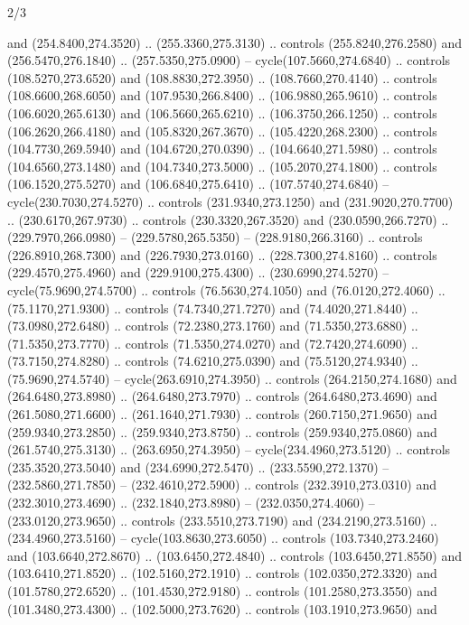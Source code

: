 \begin{flagdescription}{2/3}
\begin{scope}[xshift=0.5\flaglength,yshift=0.5\flagwidth,scale=\stretchfactor]
\begin{scope}[scale=0.001645\flagwidth,yshift=65mm,xshift=-63mm]
\begin{scope}[y=0.80pt, x=0.80pt, yscale=-1,]
\begin{scope}[cm={{1.33333,0.0,0.0,1.33333,(0.0,1e-05)}}]
  and (254.8400,274.3520) .. (255.3360,275.3130) .. controls (255.8240,276.2580)
  and (256.5470,276.1840) .. (257.5350,275.0900) -- cycle(107.5660,274.6840) ..
  controls (108.5270,273.6520) and (108.8830,272.3950) .. (108.7660,270.4140) ..
  controls (108.6600,268.6050) and (107.9530,266.8400) .. (106.9880,265.9610) ..
  controls (106.6020,265.6130) and (106.5660,265.6210) .. (106.3750,266.1250) ..
  controls (106.2620,266.4180) and (105.8320,267.3670) .. (105.4220,268.2300) ..
  controls (104.7730,269.5940) and (104.6720,270.0390) .. (104.6640,271.5980) ..
  controls (104.6560,273.1480) and (104.7340,273.5000) .. (105.2070,274.1800) ..
  controls (106.1520,275.5270) and (106.6840,275.6410) .. (107.5740,274.6840) --
  cycle(230.7030,274.5270) .. controls (231.9340,273.1250) and
  (231.9020,270.7700) .. (230.6170,267.9730) .. controls (230.3320,267.3520) and
  (230.0590,266.7270) .. (229.7970,266.0980) -- (229.5780,265.5350) --
  (228.9180,266.3160) .. controls (226.8910,268.7300) and (226.7930,273.0160) ..
  (228.7300,274.8160) .. controls (229.4570,275.4960) and (229.9100,275.4300) ..
  (230.6990,274.5270) -- cycle(75.9690,274.5700) .. controls (76.5630,274.1050)
  and (76.0120,272.4060) .. (75.1170,271.9300) .. controls (74.7340,271.7270)
  and (74.4020,271.8440) .. (73.0980,272.6480) .. controls (72.2380,273.1760)
  and (71.5350,273.6880) .. (71.5350,273.7770) .. controls (71.5350,274.0270)
  and (72.7420,274.6090) .. (73.7150,274.8280) .. controls (74.6210,275.0390)
  and (75.5120,274.9340) .. (75.9690,274.5740) -- cycle(263.6910,274.3950) ..
  controls (264.2150,274.1680) and (264.6480,273.8980) .. (264.6480,273.7970) ..
  controls (264.6480,273.4690) and (261.5080,271.6600) .. (261.1640,271.7930) ..
  controls (260.7150,271.9650) and (259.9340,273.2850) .. (259.9340,273.8750) ..
  controls (259.9340,275.0860) and (261.5740,275.3130) .. (263.6950,274.3950) --
  cycle(234.4960,273.5120) .. controls (235.3520,273.5040) and
  (234.6990,272.5470) .. (233.5590,272.1370) -- (232.5860,271.7850) --
  (232.4610,272.5900) .. controls (232.3910,273.0310) and (232.3010,273.4690) ..
  (232.1840,273.8980) -- (232.0350,274.4060) -- (233.0120,273.9650) .. controls
  (233.5510,273.7190) and (234.2190,273.5160) .. (234.4960,273.5160) --
  cycle(103.8630,273.6050) .. controls (103.7340,273.2460) and
  (103.6640,272.8670) .. (103.6450,272.4840) .. controls (103.6450,271.8550) and
  (103.6410,271.8520) .. (102.5160,272.1910) .. controls (102.0350,272.3320) and
  (101.5780,272.6520) .. (101.4530,272.9180) .. controls (101.2580,273.3550) and
  (101.3480,273.4300) .. (102.5000,273.7620) .. controls (103.1910,273.9650) and

\end{scope}
\end{scope}
\end{scope}
\end{scope}
\end{flagdescription}
